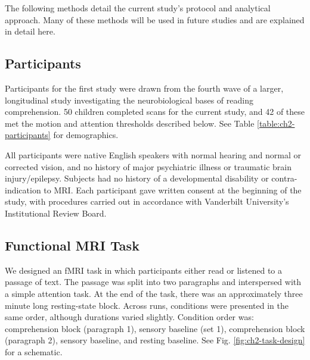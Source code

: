 The following methods detail the current study's protocol and analytical approach. Many of these methods will be used in future studies and are explained in detail here. 

\subsection{Participants}

Participants for the first study were drawn from the fourth wave of a larger, longitudinal study investigating the neurobiological bases of reading comprehension. 50 children completed scans for the current study, and 42 of these met the motion and attention thresholds described below. See Table \ref{table:ch2-participants} for demographics. 

All participants were native English speakers with normal hearing and normal or corrected vision, and no history of major psychiatric illness or traumatic brain injury/epilepsy. Subjects had no history of a developmental disability or contra-indication to MRI.  Each participant gave written consent at the beginning of the study, with procedures carried out in accordance with Vanderbilt University’s Institutional Review Board.

\begin{table}
	\scriptsize
	\renewcommand{\tabcolsep}{0.09cm}
	\centering
	
	\caption[Participant demographics for Study 1.]
	\label{table:ch2-participants}
\end{table}


\subsection{Functional MRI Task}

We designed an fMRI task in which participants either read or listened to a passage of text. The passage was split into two paragraphs and interspersed with a simple attention task. At the end of the task, there was an approximately three minute long resting-state block. Across runs, conditions were presented in the same order, although durations varied slightly. Condition order was: comprehension block (paragraph 1), sensory baseline (set 1), comprehension block (paragraph 2), sensory baseline, and resting baseline. See Fig. \ref{fig:ch2-task-design} for a schematic.

